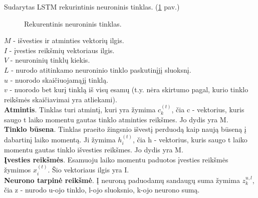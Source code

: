 Sudarytas LSTM rekurintinis neuroninis tinklas. (\ref{fig:rnnnn} pav.)

\begin{figure}[h!]
  \centering
{}
\caption{Rekurentinis neuroninis tinklas.}
\label{fig:rnnnn}
\end{figure}


$M$ - išvesties ir atminties vektorių ilgis.\\
$I$ - įvesties reikšmių vektoriaus ilgis.\\
$V$ - neuroninių tinklų kiekis. \\
$L$ - nurodo atitinkamo neuroninio tinklo paskutinįjį sluoksnį.\\
$u$ - nuorodo skaičiuojamąjį tinklą.\\
$v$ - nuorodo bet kurį tinklą iš visų esamų (t.y. nėra skirtumo pagal, kurio tinklo reikšmės skaičiavimai yra atliekami).\\

\textbf{Atmintis}. Tinklas turi atmintį, kuri yra žymima $c_k^{(t)}$, čia c - vektorius, kuris saugo t laiko momentu gautas tinklo atminties reikšmes. Jo dydis yra M.\\

\textbf{Tinklo būsena}. Tinklas praeito žingsnio išvestį perduodą kaip naują būseną į dabartinį laiko momentą. Ji žymima $h_i^{(t)}$, čia h - vektorius, kuris saugo t laiko momentu gautas tinklo išvesties reikšmes. Jo dydis yra M. \\

\textbf{Įvesties reikšmės}. Esamuoju laiko momentu paduotos įvesties reikšmės žymimos $x_i^{(t)}$. Šio vektoriaus ilgis yra I. \\

\textbf{Neurono tarpinė reikšmė}. Į neuroną paduodamų sandaugų suma žymima $z_k^{u,l}$, čia z - nurodo u-ojo tinklo, l-ojo sluoksnio, k-ojo neurono sumą.\\

